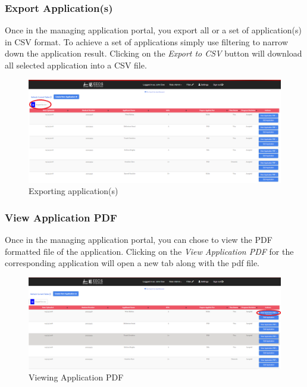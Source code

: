 \documentclass[fontsize=12pt,paper=letter,twoside]{scrartcl}
\begin{document}
\clearpage
\subsubsection{Export Application(s)}
Once in the managing application portal, you export all or a set of application(s) in CSV format. To achieve a set of applications simply use filtering to narrow down the application result. Clicking on the \emph{Export to CSV} button will download all selected application into a CSV file.

\begin{figure}[!htb]
\begin{center}
\includegraphics[width=.99\textwidth]{images/adm/ma/export_appl.png}
\end{center}
\caption{Exporting application(s)}
\label{fig:adm/export_appl}
\end{figure}

\clearpage
\subsubsection{View Application PDF}
Once in the managing application portal, you can chose to view the PDF formatted file of the application. Clicking on the \emph{View Application PDF} for the corresponding application will open a new tab along with the pdf file.

\begin{figure}[!htb]
\begin{center}
\includegraphics[width=.9\textwidth]{images/adm/ma/view_appl_app.png}
\end{center}
\caption{Viewing Application PDF}
\label{fig:adm/view_appl_app}
\end{figure}
\end{document}
